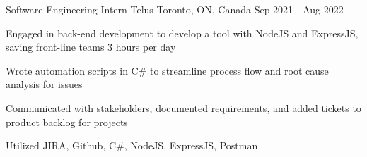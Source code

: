 
\begin{cventries}

  \cventry
    {Software Engineering Intern} %
    {Telus} %
    {Toronto, ON, Canada} %
    {Sep 2021 - Aug 2022} %
    {
      \begin{cvitems} %
\item Engaged in back-end development to develop a tool with NodeJS and ExpressJS, saving front-line teams 3 hours per day
\item Wrote automation scripts in C\# to streamline process flow and root cause analysis for issues
\item Communicated with stakeholders, documented requirements, and added tickets to product backlog for projects
\item Utilized JIRA, Github, C\#, NodeJS, ExpressJS, Postman
      \end{cvitems}
    }


\end{cventries}

